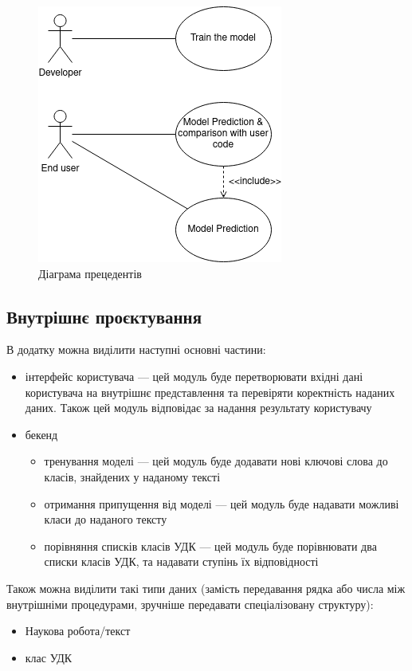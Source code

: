 \documentclass[14pt]{extarticle}
\begin{document}
  \begin{figure}[H]
    \centering
    \includegraphics{use-case.drawio.png}    
    \caption{Діаграма прецедентів}
    \label{fig:use-case}
  \end{figure}

  \subsection{Внутрішнє проєктування}
  В додатку можна виділити наступні основні частини:
  \begin{itemize}[labelindent=\dimexpr{}\relax, leftmargin=*]
    \item інтерфейс користувача --- цей модуль буде перетворювати вхідні дані користувача на внутрішнє представлення та перевіряти коректність наданих даних. Також цей модуль відповідає за надання результату користувачу
    \item бекенд
      \begin{itemize}[labelindent=\dimexpr\parindent\relax, leftmargin=*]
        \item тренування моделі --- цей модуль буде додавати нові ключові слова до класів, знайдених у наданому тексті
        \item отримання припущення від моделі --- цей модуль буде надавати можливі класи до наданого тексту
        \item порівняння списків класів УДК --- цей модуль буде порівнювати два списки класів УДК, та надавати ступінь їх відповідності
      \end{itemize}
  \end{itemize}
  
  Також можна виділити такі типи даних (замість передавання рядка або числа між внутрішніми процедурами, зручніше передавати спеціалізовану структуру):
  \begin{itemize}[labelindent=\dimexpr{}\relax, leftmargin=*]
    \item Наукова робота/текст
    \item клас УДК
  \end{itemize}
\end{document}
